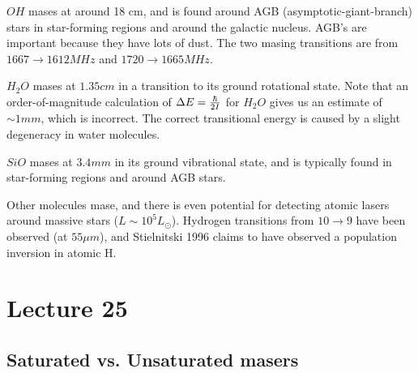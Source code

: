 \documentclass[11pt]{article}
\begin{document}
$OH$ mases at around 18 cm, and is found around AGB (asymptotic-giant-branch)
stars in star-forming regions and around the galactic nucleus.  AGB's are
important because they have lots of dust.  The two masing transitions are
from $1667\to1612MHz$ and $1720\to1665MHz$.\par
$H_2O$ mases at $1.35 cm$ in a transition to its ground rotational state.  Note
that an order-of-magnitude calculation of $\Delta E={\hbar\over 2I}$ for $H_2O$
gives us an estimate of $\sim 1 mm$, which is incorrect.  The correct 
transitional energy is caused by a slight degeneracy in water molecules.\par
$SiO$ mases at $3.4 mm$ in its ground vibrational state, and is typically
found in star-forming regions and around AGB stars.\par
Other molecules mase, and there is even potential for detecting atomic lasers 
around massive stars ($L\sim10^5 L_\odot$).  Hydrogen transitions from $10\to9$
have been observed (at $55\mu m$), and Stielnitski 1996 claims to have observed
a population inversion in atomic H.

\section*{ Lecture 25 }

\subsection*{ Saturated vs. Unsaturated masers }
\end{document}
